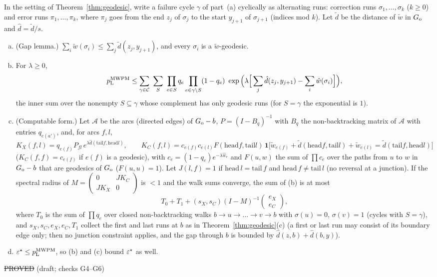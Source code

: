 \begin{theorem}\label{thm:gap}
In the setting of Theorem~\ref{thm:geodesic}, write a failure cycle $\gamma$ of part~(a) cyclically as alternating runs: correction runs $\sigma_1,\dots,\sigma_k$ ($k\ge0$) and error runs $\pi_1,\dots,\pi_k$, where $\pi_j$ goes from the end $z_j$ of $\sigma_j$ to the start $y_{j+1}$ of $\sigma_{j+1}$ (indices mod $k$). Let $\tilde d$ be the distance of $\tilde w$ in $G_{\rm o}$ and $\hat d=\tilde d/s$.
\begin{enumerate}[(a)]
\item (Gap lemma.) $\sum_i\tilde w(\sigma_i)\le\sum_j\tilde d(z_j,y_{j+1})$, and every $\sigma_i$ is a $\tilde w$-geodesic.
\item For $\lambda\ge0$,
\[
\pL^{\rm MWPM}\le\sum_{\gamma\in\mathcal C}\ \sum_{S}\ \prod_{e\in S}q_e\prod_{e\in\gamma\setminus S}(1-q_e)\ \exp\Big(\lambda\Big[\sum_j\hat d(z_j,y_{j+1})-\sum_i\hat w(\sigma_i)\Big]\Big),
\]
the inner sum over the nonempty $S\subseteq\gamma$ whose complement has only geodesic runs (for $S=\gamma$ the exponential is $1$).
\item (Computable form.) Let $\mathcal A$ be the arcs (directed edges) of $G_{\rm o}-b$, $P=(I-B_q)^{-1}$ with $B_q$ the non-backtracking matrix of $\mathcal A$ with entries $q_{e(a')}$, and, for arcs $f,l$,
\[
K_X(f,l)=q_{e(f)}P_{fl}\,e^{\lambda\hat d(\mathrm{tail}f,\mathrm{head}l)},\qquad
K_C(f,l)=c_{e(f)}c_{e(l)}F(\mathrm{head}f,\mathrm{tail}l)\,\mathbf 1\big[\tilde w_{e(f)}+\tilde d(\mathrm{head}f,\mathrm{tail}l)+\tilde w_{e(l)}=\tilde d(\mathrm{tail}f,\mathrm{head}l)\big]
\]
($K_C(f,f)=c_{e(f)}$ if $e(f)$ is a geodesic), with $c_e=(1-q_e)e^{-\lambda\hat w_e}$ and $F(u,w)$ the sum of $\prod c_e$ over the paths from $u$ to $w$ in $G_{\rm o}-b$ that are geodesics of $G_{\rm o}$ ($F(u,u)=1$). Let $J(l,f)=1$ if $\mathrm{head}\,l=\mathrm{tail}\,f$ and $\mathrm{head}\,f\ne\mathrm{tail}\,l$ (no reversal at a junction). If the spectral radius of $M=\begin{pmatrix}0&JK_C\\JK_X&0\end{pmatrix}$ is $<1$ and the walk sums converge, the sum of (b) is at most
\[
T_0+T_1+(s_X,s_C)(I-M)^{-1}\begin{pmatrix}e_X\\e_C\end{pmatrix},
\]
where $T_0$ is the sum of $\prod q_e$ over closed non-backtracking walks $b\to u\to\dots\to v\to b$ with $\sigma(u)=0$, $\sigma(v)=1$ (cycles with $S=\gamma$), and $s_X,s_C,e_X,e_C,T_1$ collect the first and last runs at $b$ as in Theorem~\ref{thm:geodesic}(c) (a first or last run may consist of its boundary edge only; then no junction constraint applies, and the gap through $b$ is bounded by $\hat d(z,b)+\hat d(b,y)$).
\item $\varepsilon^{\star}\le p_{\mathrm{L}}^{\rm MWPM}$, so (b) and (c) bound $\varepsilon^{\star}$ as well.
\end{enumerate}
\hfill\st{PROVED} (draft; checks G4--G6)
\end{theorem}
